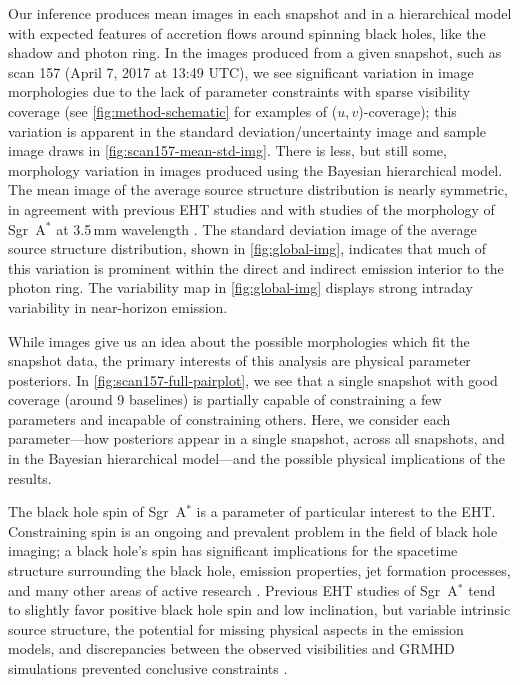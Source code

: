 \documentclass[linenumbers, twocolumn, tighten]{aastex701}
\def\sgra{Sgr~A$^*$\xspace}
\begin{document}
Our inference produces mean images in each snapshot and in a hierarchical model with expected features of accretion flows around spinning black holes, like the shadow and photon ring. In the images produced from a given snapshot, such as scan 157 (April 7, 2017 at 13:49 UTC), we see significant variation in image morphologies due to the lack of parameter constraints with sparse visibility coverage (see \autoref{fig:method-schematic} for examples of ($u,v$)-coverage); this variation is apparent in the standard deviation/uncertainty image and sample image draws in \autoref{fig:scan157-mean-std-img}. There is less, but still some, morphology variation in images produced using the Bayesian hierarchical model. The mean image of the average source structure distribution is nearly symmetric, in agreement with previous EHT studies  and with studies of the morphology of \sgra at 3.5\,mm wavelength \citep{2019ApJ...871...30I}. The standard deviation image of the average source structure distribution, shown in \autoref{fig:global-img}, indicates that much of this variation is prominent within the direct and indirect emission interior to the photon ring. The variability map in \autoref{fig:global-img} displays strong intraday variability in near-horizon emission.

While images give us an idea about the possible morphologies which fit the snapshot data, the primary interests of this analysis are physical parameter posteriors. In \autoref{fig:scan157-full-pairplot}, we see that a single snapshot with good coverage (around 9 baselines) is partially capable of constraining a few parameters and incapable of constraining others. Here, we consider each parameter---how posteriors appear in a single snapshot, across all snapshots, and in the Bayesian hierarchical model---and the possible physical implications of the results.

The black hole spin of \sgra is a parameter of particular interest to the EHT. Constraining spin is an ongoing and prevalent problem in the field of black hole imaging; a black hole's spin has significant implications for the spacetime structure surrounding the black hole, emission properties, jet formation processes, and many other areas of active research \citep[e.g.][]{1977MNRAS.179..433B, EHT2019-V, 2022MNRAS.511.3795N}. Previous EHT studies of \sgra tend to slightly favor positive black hole spin and low inclination, but variable intrinsic source structure, the potential for missing physical aspects in the emission models, and discrepancies between the observed visibilities and GRMHD simulations prevented conclusive constraints . 
\end{document}
